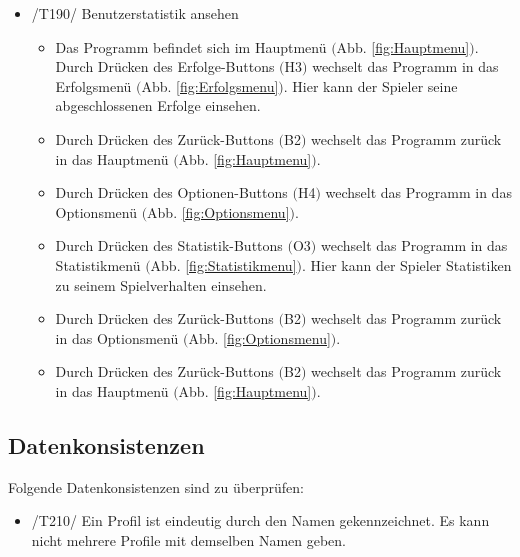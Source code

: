 \begin{itemize}
\item /T190/ Benutzerstatistik ansehen
\begin{itemize}
\item Das Programm befindet sich im Hauptmenü $($Abb. \ref{fig:Hauptmenu}$)$. Durch Drücken des Erfolge-Buttons $($H3$)$ wechselt das Programm in das Erfolgsmenü $($Abb. \ref{fig:Erfolgsmenu}$)$. Hier kann der Spieler seine abgeschlossenen Erfolge einsehen.
\item Durch Drücken des Zurück-Buttons $($B2$)$ wechselt das Programm zurück in das Hauptmenü $($Abb. \ref{fig:Hauptmenu}$)$.
\item Durch Drücken des Optionen-Buttons $($H4$)$ wechselt das Programm in das Optionsmenü $($Abb. \ref{fig:Optionsmenu}$)$.
\item Durch Drücken des Statistik-Buttons $($O3$)$ wechselt das Programm in das Statistikmenü $($Abb. \ref{fig:Statistikmenu}$)$. Hier kann der Spieler Statistiken zu seinem Spielverhalten einsehen.
\item Durch Drücken des Zurück-Buttons $($B2$)$ wechselt das Programm zurück in das Optionsmenü $($Abb. \ref{fig:Optionsmenu}$)$.
\item Durch Drücken des Zurück-Buttons $($B2$)$ wechselt das Programm zurück in das Hauptmenü $($Abb. \ref{fig:Hauptmenu}$)$.
\end{itemize}

\end{itemize}

\subsection{Datenkonsistenzen}
Folgende Datenkonsistenzen sind zu überprüfen:

\begin{itemize}
\item /T210/ Ein Profil ist eindeutig durch den Namen gekennzeichnet. Es kann nicht mehrere Profile mit demselben Namen geben.
\end{itemize}
